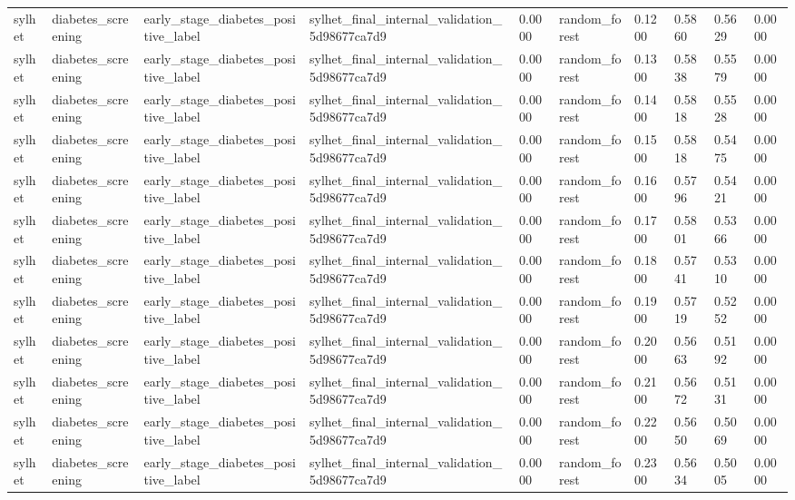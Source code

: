 \begin{tabular}{llllllllll}
sylhet & diabetes\_screening & early\_stage\_diabetes\_positive\_label & sylhet\_final\_internal\_validation\_5d98677ca7d9 & 0.0000 & random\_forest & 0.1200 & 0.5860 & 0.5629 & 0.0000 \\
sylhet & diabetes\_screening & early\_stage\_diabetes\_positive\_label & sylhet\_final\_internal\_validation\_5d98677ca7d9 & 0.0000 & random\_forest & 0.1300 & 0.5838 & 0.5579 & 0.0000 \\
sylhet & diabetes\_screening & early\_stage\_diabetes\_positive\_label & sylhet\_final\_internal\_validation\_5d98677ca7d9 & 0.0000 & random\_forest & 0.1400 & 0.5818 & 0.5528 & 0.0000 \\
sylhet & diabetes\_screening & early\_stage\_diabetes\_positive\_label & sylhet\_final\_internal\_validation\_5d98677ca7d9 & 0.0000 & random\_forest & 0.1500 & 0.5818 & 0.5475 & 0.0000 \\
sylhet & diabetes\_screening & early\_stage\_diabetes\_positive\_label & sylhet\_final\_internal\_validation\_5d98677ca7d9 & 0.0000 & random\_forest & 0.1600 & 0.5796 & 0.5421 & 0.0000 \\
sylhet & diabetes\_screening & early\_stage\_diabetes\_positive\_label & sylhet\_final\_internal\_validation\_5d98677ca7d9 & 0.0000 & random\_forest & 0.1700 & 0.5801 & 0.5366 & 0.0000 \\
sylhet & diabetes\_screening & early\_stage\_diabetes\_positive\_label & sylhet\_final\_internal\_validation\_5d98677ca7d9 & 0.0000 & random\_forest & 0.1800 & 0.5741 & 0.5310 & 0.0000 \\
sylhet & diabetes\_screening & early\_stage\_diabetes\_positive\_label & sylhet\_final\_internal\_validation\_5d98677ca7d9 & 0.0000 & random\_forest & 0.1900 & 0.5719 & 0.5252 & 0.0000 \\
sylhet & diabetes\_screening & early\_stage\_diabetes\_positive\_label & sylhet\_final\_internal\_validation\_5d98677ca7d9 & 0.0000 & random\_forest & 0.2000 & 0.5663 & 0.5192 & 0.0000 \\
sylhet & diabetes\_screening & early\_stage\_diabetes\_positive\_label & sylhet\_final\_internal\_validation\_5d98677ca7d9 & 0.0000 & random\_forest & 0.2100 & 0.5672 & 0.5131 & 0.0000 \\
sylhet & diabetes\_screening & early\_stage\_diabetes\_positive\_label & sylhet\_final\_internal\_validation\_5d98677ca7d9 & 0.0000 & random\_forest & 0.2200 & 0.5650 & 0.5069 & 0.0000 \\
sylhet & diabetes\_screening & early\_stage\_diabetes\_positive\_label & sylhet\_final\_internal\_validation\_5d98677ca7d9 & 0.0000 & random\_forest & 0.2300 & 0.5634 & 0.5005 & 0.0000 \\

\end{tabular}
